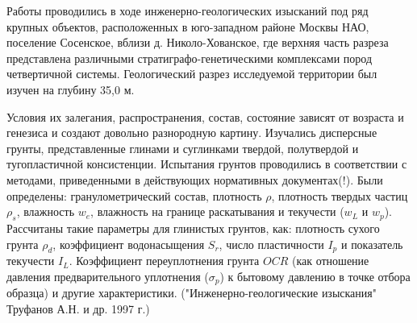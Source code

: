 Работы проводились в ходе инженерно-геологических изысканий под ряд крупных объектов, расположенных в юго-западном районе Москвы НАО, поселение Сосенское, вблизи д. Николо-Хованское, где верхняя часть разреза представлена различными стратиграфо-генетическими комплексами пород четвертичной системы. Геологический разрез исследуемой территории был изучен на глубину 35,0 м.

Условия их залегания, распространения, состав, состояние зависят от возраста и генезиса и создают довольно разнородную картину. Изучались дисперсные грунты, представленные глинами и суглинками твердой, полутвердой и тугопластичной консистенции. Испытания грунтов проводились в соответствии с методами, приведенными в действующих нормативных документах(!). Были определены: гранулометрический состав, плотность $\rho$, плотность твердых частиц $\rho_s$, влажность $w_e$, влажность на границе раскатывания и текучести ($w_L$ и $w_p$). Рассчитаны такие параметры для глинистых грунтов, как: плотность сухого грунта $\rho_d$,  коэффициент водонасыщения $S_r$, число пластичности $I_p$ и показатель текучести $I_L$. Коэффициент переуплотнения грунта $OCR$ (как отношение давления предварительного уплотнения ($\sigma_p$) к бытовому давлению в точке отбора образца) и другие характеристики. ("Инженерно-геологические изыскания" Труфанов А.Н. и др. 1997 г.)